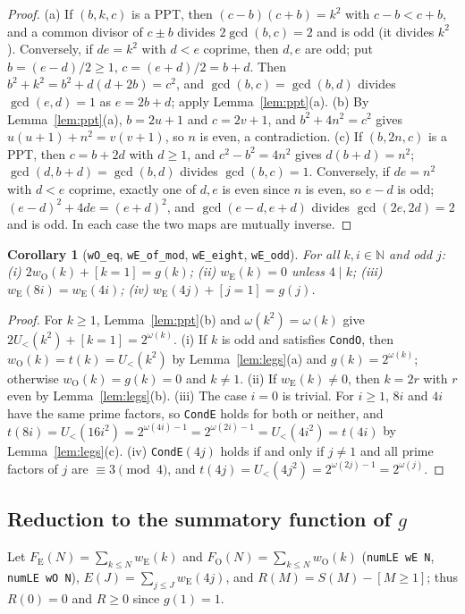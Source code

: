 \documentclass[11pt]{amsart}
\theoremstyle{plain}
\newtheorem{corollary}[theorem]{Corollary}
\theoremstyle{definition}
\newcommand{\code}[1]{\texttt{#1}}
\newcommand{\N}{\mathbb{N}}
\newcommand{\wE}{w_{\mathrm E}}
\newcommand{\wO}{w_{\mathrm O}}
\newcommand{\FE}{F_{\mathrm E}}
\newcommand{\FO}{F_{\mathrm O}}
\begin{document}
\begin{proof}
(a) If $(b,k,c)$ is a PPT, then $(c-b)(c+b)=k^2$ with $c-b<c+b$, and a common divisor of $c\pm b$ divides $2\gcd(b,c)=2$ and is odd (it divides $k^2$). Conversely, if $de=k^2$ with $d<e$ coprime, then $d,e$ are odd; put $b=(e-d)/2\ge1$, $c=(e+d)/2=b+d$. Then $b^2+k^2=b^2+d(d+2b)=c^2$, and $\gcd(b,c)=\gcd(b,d)$ divides $\gcd(e,d)=1$ as $e=2b+d$; apply Lemma~\ref{lem:ppt}(a).
(b) By Lemma~\ref{lem:ppt}(a), $b=2u+1$ and $c=2v+1$, and $b^2+4n^2=c^2$ gives $u(u+1)+n^2=v(v+1)$, so $n$ is even, a contradiction.
(c) If $(b,2n,c)$ is a PPT, then $c=b+2d$ with $d\ge1$, and $c^2-b^2=4n^2$ gives $d(b+d)=n^2$; $\gcd(d,b+d)=\gcd(b,d)$ divides $\gcd(b,c)=1$. Conversely, if $de=n^2$ with $d<e$ coprime, exactly one of $d,e$ is even since $n$ is even, so $e-d$ is odd; $(e-d)^2+4de=(e+d)^2$, and $\gcd(e-d,e+d)$ divides $\gcd(2e,2d)=2$ and is odd. In each case the two maps are mutually inverse.
\end{proof}

\begin{corollary}[\code{wO\_eq}, \code{wE\_of\_mod}, \code{wE\_eight}, \code{wE\_odd}]\label{cor:weights}
For all $k,i\in\N$ and odd $j$: (i) $2\wO(k)+[k=1]=g(k)$; (ii) $\wE(k)=0$ unless $4\mid k$; (iii) $\wE(8i)=\wE(4i)$; (iv) $\wE(4j)+[j=1]=g(j)$.
\end{corollary}

\begin{proof}
For $k\ge1$, Lemma~\ref{lem:ppt}(b) and $\omega(k^2)=\omega(k)$ give $2U_<(k^2)+[k=1]=2^{\omega(k)}$.
(i) If $k$ is odd and satisfies \code{CondO}, then $\wO(k)=t(k)=U_<(k^2)$ by Lemma~\ref{lem:legs}(a) and $g(k)=2^{\omega(k)}$; otherwise $\wO(k)=g(k)=0$ and $k\ne1$.
(ii) If $\wE(k)\ne0$, then $k=2r$ with $r$ even by Lemma~\ref{lem:legs}(b).
(iii) The case $i=0$ is trivial. For $i\ge1$, $8i$ and $4i$ have the same prime factors, so \code{CondE} holds for both or neither, and $t(8i)=U_<(16i^2)=2^{\omega(4i)-1}=2^{\omega(2i)-1}=U_<(4i^2)=t(4i)$ by Lemma~\ref{lem:legs}(c).
(iv) \code{CondE}$(4j)$ holds if and only if $j\ne1$ and all prime factors of $j$ are $\equiv3\pmod4$, and $t(4j)=U_<(4j^2)=2^{\omega(2j)-1}=2^{\omega(j)}$.
\end{proof}

\subsection{Reduction to the summatory function of \texorpdfstring{$g$}{g}}
Let $\FE(N)=\sum_{k\le N}\wE(k)$ and $\FO(N)=\sum_{k\le N}\wO(k)$ (\code{numLE wE N}, \code{numLE wO N}), $E(J)=\sum_{j\le J}\wE(4j)$, and $R(M)=S(M)-[M\ge1]$; thus $R(0)=0$ and $R\ge0$ since $g(1)=1$.
\end{document}

